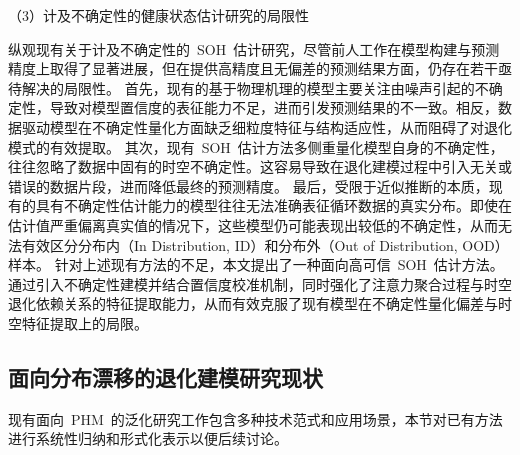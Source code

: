 （3）计及不确定性的健康状态估计研究的局限性

纵观现有关于计及不确定性的~SOH~估计研究，尽管前人工作在模型构建与预测精度上取得了显著进展，但在提供高精度且无偏差的预测结果方面，仍存在若干亟待解决的局限性。
首先，现有的基于物理机理的模型主要关注由噪声引起的不确定性，导致对模型置信度的表征能力不足，进而引发预测结果的不一致。相反，数据驱动模型在不确定性量化方面缺乏细粒度特征与结构适应性，从而阻碍了对退化模式的有效提取。
其次，现有~SOH~估计方法多侧重量化模型自身的不确定性，往往忽略了数据中固有的时空不确定性。这容易导致在退化建模过程中引入无关或错误的数据片段，进而降低最终的预测精度。
最后，受限于近似推断的本质，现有的具有不确定性估计能力的模型往往无法准确表征循环数据的真实分布。即使在估计值严重偏离真实值的情况下，这些模型仍可能表现出较低的不确定性，从而无法有效区分分布内（In Distribution, ID）和分布外（Out of Distribution, OOD）样本。
针对上述现有方法的不足，本文提出了一种面向高可信~SOH~估计方法。通过引入不确定性建模并结合置信度校准机制，同时强化了注意力聚合过程与时空退化依赖关系的特征提取能力，从而有效克服了现有模型在不确定性量化偏差与时空特征提取上的局限。

\subsection{面向分布漂移的退化建模研究现状}\label{subsec:degradation_modeling}

现有面向~PHM~的泛化研究工作包含多种技术范式和应用场景，本节对已有方法进行系统性归纳和形式化表示以便后续讨论。

